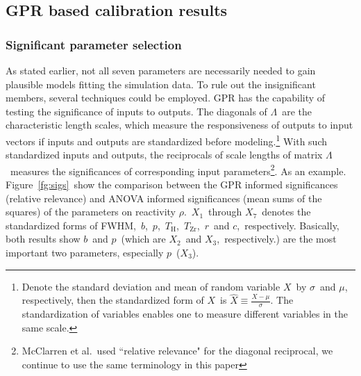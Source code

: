 \documentclass[review]{elsarticle}
\begin{document}
\subsection{GPR based calibration results}
\subsubsection{Significant parameter selection}
As stated earlier, not all seven parameters are necessarily needed to gain plausible models fitting the simulation data. To rule out the insignificant members, several techniques could be employed. %
GPR has the capability of testing the significance of inputs to outputs\cite{pie}. The diagonals of $\Lambda$~are the characteristic length scales, which measure the responsiveness of outputs to input vectors if inputs and outputs are standardized before modeling.\footnote{Denote the standard deviation and mean of random variable $X$~by $\sigma$~and $\mu$, respectively, then the standardized form of $X$~is $\hat{X}\equiv\frac{X-\mu}{\sigma}$. The standardization of variables enables one to measure different variables in the same scale.} With such standardized inputs and outputs, the reciprocals of scale lengths of matrix $\Lambda$~measures the significances of corresponding input parameters\footnote{McClarren et al.~used ``relative relevance" for the diagonal reciprocal, we continue to use the same terminology in this paper}\cite{pie}. As an example. Figure~\ref{fg:sigs}~show the comparison between the GPR informed significances (relative relevance) and ANOVA informed significances (mean sums of the squares) of the parameters on reactivity $\rho$.~$X_\mathrm{1}$~through $X_\mathrm{7}$~denotes the standardized forms of FWHM,~$b$,~$p$,~$T_\mathrm{H}$,~$T_\mathrm{Zr}$,~$r$~and $c$,~respectively. Basically, both results show $b$~and $p$~(which are $X_\mathrm{2}$~and $X_\mathrm{3}$,~respectively.) are the most important two parameters, especially $p$~($X_\mathrm{3}$).
\end{document}
